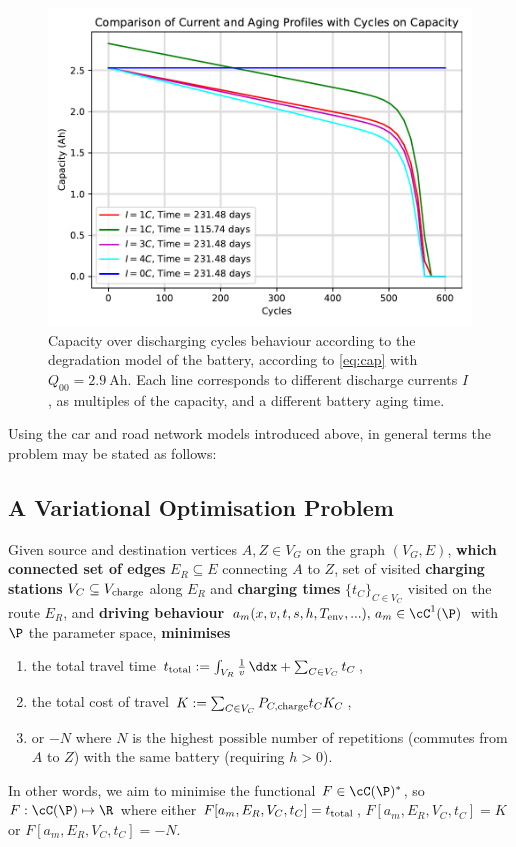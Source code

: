 \documentclass{prettytex/ox/mmsc-special-topic}
\begin{document}
  \begin{figure}[H]
    \centering
    \includegraphics[width=0.7\linewidth]{figures/aging.pdf}
    \caption{Capacity over discharging cycles behaviour according to the degradation model of the battery, according to \autoref{eq:cap} with $Q_{00} = \SI{2.9}{\ampere\hour}$. Each line corresponds to different discharge currents $I$, as multiples of the capacity, and a different battery aging time.}
    \label{fig:aging}
  \end{figure}

  Using the car and road network models introduced above, in general terms the problem may be stated as follows:

  \subsection{A Variational Optimisation Problem}
  \label{sec:problem}
  Given source and destination vertices $A, Z \in V_G$ on the graph $(V_G, E)$, \textbf{which connected set of edges} $E_R \subseteq E$ connecting $A$ to $Z$, set of visited \textbf{charging stations} $V_C \subseteq V_{\rm charge}$ along $E_R$ and \textbf{charging times} $\{t_C\}_{C \in V_C}$ visited on the route $E_R$, and \textbf{driving behaviour} $a_m(x, v, t, s, h, T_{\rm env}, ...),\, a_m \in \cC^1(\P)$ with $\P$ the parameter space, \textbf{minimises}
  \begin{enumerate}
    \item the total travel time $t_{\rm total} := \int_{V_R} \frac{1}{v} \,\ddx + \sum_{C \in V_C} t_C$,
    \item the total cost of travel $K := \sum_{C \in V_C} P_{C, \rm charge} t_{C} K_C$,
    \item or $-N$ where $N$ is the highest possible number of repetitions (commutes from $A$ to $Z$) with the same battery (requiring $h > 0$). \label{minoption:aging}
  \end{enumerate}
  In other words, we aim to minimise the functional $F \in \cC(\P)^*$, so $F: \cC(\P) \mapsto \R$ where either $F[a_m, E_R, V_C, t_C] = t_{\rm total}$, $F[a_m, E_R, V_C, t_C] = K$ or $F[a_m, E_R, V_C, t_C] = -N$.
\end{document}
